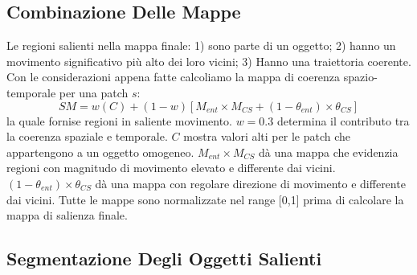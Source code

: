 \documentclass[12pt,oneside]{IEEEtran}
\begin{document}
		\subsection{Combinazione Delle Mappe}
			Le regioni salienti nella mappa finale: 1) sono parte di un oggetto; 2) hanno un movimento significativo più alto dei loro vicini; 3) Hanno una traiettoria coerente. Con le considerazioni appena fatte calcoliamo la mappa di coerenza spazio-temporale per una patch $s$:
			\begin{equation}
			SM = w(C)+(1-w)[M_{ent} \times M_{CS}+(1-\theta_{ent})\times\theta_{CS}]
			\end{equation}
			la quale fornise regioni in saliente movimento. $w = 0.3$ determina il contributo tra la coerenza spaziale e temporale. $C$ mostra valori alti per le patch che appartengono a un oggetto omogeneo. $M_{ent} \times M_{CS}$ dà una mappa che evidenzia regioni con magnitudo di movimento elevato e differente dai vicini. $(1-\theta_{ent})\times\theta_{CS}$ dà una mappa con regolare direzione di movimento e differente dai vicini. Tutte le mappe sono normalizzate nel range [0,1] prima di calcolare la mappa di salienza finale.
		\subsection{Segmentazione Degli Oggetti Salienti} 
\end{document}
